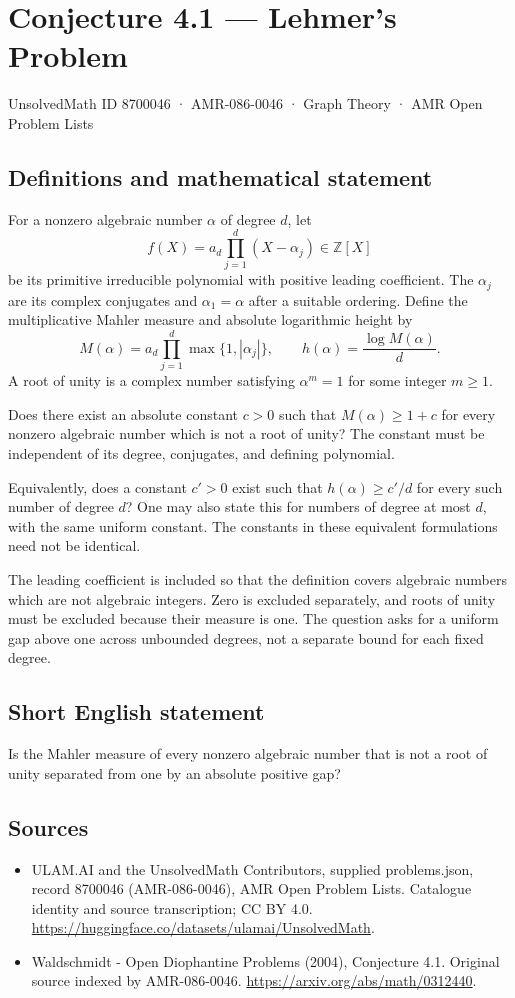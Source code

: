 \documentclass[11pt,a4paper]{article}
\begin{document}
\section*{Conjecture 4.1 — Lehmer's Problem}\label{8700046}
{\small UnsolvedMath ID 8700046 · AMR-086-0046 · Graph Theory · AMR Open Problem Lists}
\subsection{Definitions and mathematical statement}
For a nonzero algebraic number $\alpha$ of degree $d$, let
\[
f(X)=a_d\prod_{j=1}^d(X-\alpha_j)\in\mathbb Z[X]
\]
be its primitive irreducible polynomial with positive leading coefficient. The $\alpha_j$ are its complex conjugates and $\alpha_1=\alpha$ after a suitable ordering. Define the multiplicative Mahler measure and absolute logarithmic height by
\[
M(\alpha)=a_d\prod_{j=1}^d\max\{1,|\alpha_j|\},
\qquad h(\alpha)=\frac{\log M(\alpha)}d.
\]
A root of unity is a complex number satisfying $\alpha^m=1$ for some integer $m\ge1$.

Does there exist an absolute constant $c>0$ such that $M(\alpha)\ge1+c$ for every nonzero algebraic number which is not a root of unity? The constant must be independent of its degree, conjugates, and defining polynomial.

Equivalently, does a constant $c'>0$ exist such that $h(\alpha)\ge c'/d$ for every such number of degree $d$? One may also state this for numbers of degree at most $d$, with the same uniform constant. The constants in these equivalent formulations need not be identical.

The leading coefficient is included so that the definition covers algebraic numbers which are not algebraic integers. Zero is excluded separately, and roots of unity must be excluded because their measure is one. The question asks for a uniform gap above one across unbounded degrees, not a separate bound for each fixed degree.
\subsection{Short English statement}
Is the Mahler measure of every nonzero algebraic number that is not a root of unity separated from one by an absolute positive gap?
\subsection{Sources}
\begin{itemize}
\item[S1] ULAM.AI and the UnsolvedMath Contributors, supplied problems.json, record 8700046 (AMR-086-0046), AMR Open Problem Lists. Catalogue identity and source transcription; CC BY 4.0.
\url{https://huggingface.co/datasets/ulamai/UnsolvedMath}.
\item[S2] Waldschmidt - Open Diophantine Problems (2004), Conjecture 4.1. Original source indexed by AMR-086-0046.
\url{https://arxiv.org/abs/math/0312440}.
\end{itemize}
\end{document}
